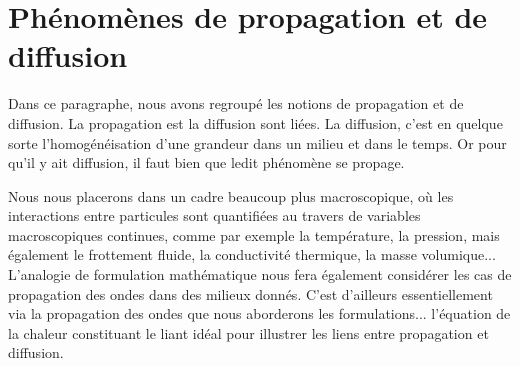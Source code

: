 \medskip
\section{Phénomènes de propagation et de diffusion}

Dans ce paragraphe, nous avons regroupé les notions de propagation et de diffusion.
\medskipvm
La propagation est la diffusion sont liées. La diffusion, c'est en quelque sorte l'homogénéisation d'une grandeur dans un milieu et dans le temps. Or pour qu'il y ait diffusion, il faut bien que ledit phénomène se propage.

\medskip
Nous nous placerons dans un cadre beaucoup plus macroscopique, où les interactions entre particules sont quantifiées au travers de variables macroscopiques continues, comme par exemple la température, la pression, mais également le frottement fluide, la conductivité thermique, la masse volumique...
\medskipvm
L'analogie de formulation mathématique nous fera également considérer les cas de propagation des ondes dans des milieux donnés. C'est d'ailleurs essentiellement via la propagation des ondes que nous aborderons les formulations... l'équation de la chaleur constituant le liant idéal pour illustrer les liens entre propagation et diffusion.

